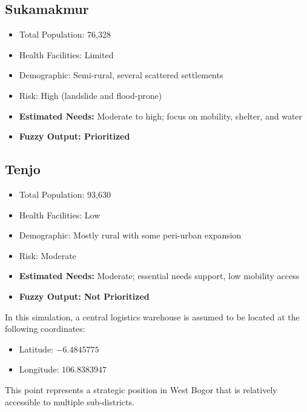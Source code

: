\documentclass[journal,final,a4paper,twoside,11pt]{IEEEtran}
\begin{document}
\subsection*{Sukamakmur}
\begin{itemize}
    \item Total Population: 76,328
    \item Health Facilities: Limited
    \item Demographic: Semi-rural, several scattered settlements
    \item Risk: High (landslide and flood-prone)
    \item \textbf{Estimated Needs:} Moderate to high; focus on mobility, shelter, and water
    \item \textbf{Fuzzy Output: Prioritized}
\end{itemize}

\subsection*{Tenjo}
\begin{itemize}
    \item Total Population: 93,630
    \item Health Facilities: Low
    \item Demographic: Mostly rural with some peri-urban expansion
    \item Risk: Moderate
    \item \textbf{Estimated Needs:} Moderate; essential needs support, low mobility access
    \item \textbf{Fuzzy Output: Not Prioritized}
\end{itemize}


In this simulation, a central logistics warehouse is assumed to be located at the following coordinates:

\begin{itemize}
    \item Latitude: $-6.4845775$
    \item Longitude: $106.8383947$
\end{itemize}

This point represents a strategic position in West Bogor that is relatively accessible to multiple sub-districts.
\end{document}
